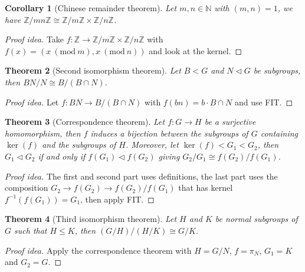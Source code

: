 \documentclass[paper=a4, fontsize=12pt]{scrartcl} %
\newtheorem{thm}{Theorem}[section]
\newtheorem{cor}[thm]{Corollary}
\theoremstyle{definition}
\theoremstyle{remark}
\newcommand{\Mod}[1]{\ (\text{mod}\ #1)}
\newcommand{\N}{\mathbb{N}}
\newcommand{\Z}{\mathbb{Z}}
\numberwithin{equation}{section} %
\numberwithin{figure}{section} %
\numberwithin{table}{section} %
\begin{document}
\begin{cor}[Chinese remainder theorem]
	Let $m,n \in \N$ with $(m,n) = 1$, we have $\Z/mn\Z \cong \Z/m\Z \times \Z/n\Z$.
\end{cor}
\begin{proof}[Proof idea]
	Take $f: \Z \rightarrow \Z/m\Z \times \Z/n\Z$ with $f(x) = (x \Mod{m}, x \Mod{n})$ and look at the kernel.
\end{proof}
\begin{thm}[Second isomorphism theorem]
	Let $B < G$ and $N \lhd G$ be subgroups, then $BN/N \cong B/(B \cap N)$.
\end{thm}
\begin{proof}[Proof idea]
	Let $f: BN \rightarrow B/(B \cap N)$ with $f(bn) = b\cdot B\cap N$ and use FIT.
\end{proof}
\begin{thm}[Correspondence theorem]
	Let $f: G \rightarrow H$ be a surjective homomorphism, then $f$ induces a bijection between the subgroups of $G$ containing $\ker(f)$ and the subgroups of $H$. Moreover, let $\ker(f) < G_1 < G_2$, then $G_1 \lhd G_2$ if and only if $f(G_1) \lhd f(G_2)$ giving $G_2/G_1 \cong f(G_2)/f(G_1)$.
\end{thm}
\begin{proof}[Proof idea]
	The first and second part uses definitions, the last part uses the composition $G_2 \rightarrow f(G_2) \rightarrow f(G_2)/f(G_1)$ that has kernel $f^{-1}(f(G_1)) = G_1$, then apply FIT.
\end{proof}
\begin{thm}[Third isomorphism theorem]
	Let $H$ and $K$ be normal subgroups of $G$ such that $H \leq K$, then $(G/H)/(H/K) \cong G/K$.
\end{thm}
\begin{proof}[Proof idea]
	Apply the correspondence theorem with $H = G/N$, $f = \pi_N$, $G_1 = K$ and $G_2 = G$.
\end{proof}
\end{document}
